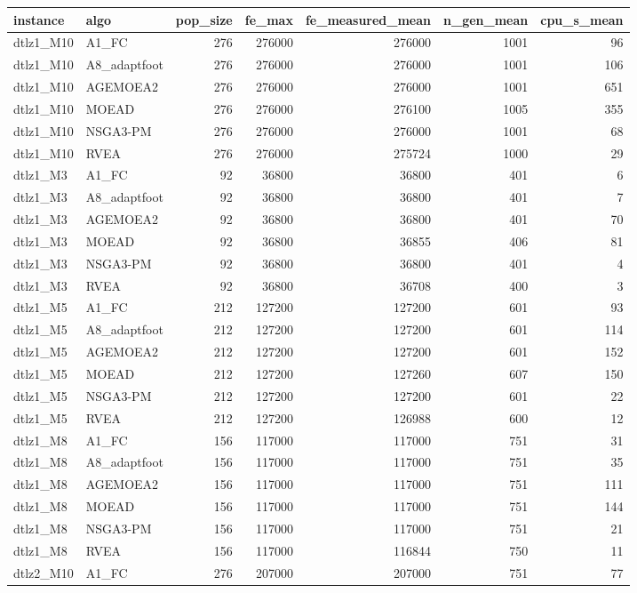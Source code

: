 \begin{tabular}{llrrrrr}
\toprule
instance & algo & pop_size & fe_max & fe_measured_mean & n_gen_mean & cpu_s_mean \\
\midrule
dtlz1_M10 & A1_FC & 276 & 276000 & 276000 & 1001 & 96 \\
dtlz1_M10 & A8_adaptfoot & 276 & 276000 & 276000 & 1001 & 106 \\
dtlz1_M10 & AGEMOEA2 & 276 & 276000 & 276000 & 1001 & 651 \\
dtlz1_M10 & MOEAD & 276 & 276000 & 276100 & 1005 & 355 \\
dtlz1_M10 & NSGA3-PM & 276 & 276000 & 276000 & 1001 & 68 \\
dtlz1_M10 & RVEA & 276 & 276000 & 275724 & 1000 & 29 \\
dtlz1_M3 & A1_FC & 92 & 36800 & 36800 & 401 & 6 \\
dtlz1_M3 & A8_adaptfoot & 92 & 36800 & 36800 & 401 & 7 \\
dtlz1_M3 & AGEMOEA2 & 92 & 36800 & 36800 & 401 & 70 \\
dtlz1_M3 & MOEAD & 92 & 36800 & 36855 & 406 & 81 \\
dtlz1_M3 & NSGA3-PM & 92 & 36800 & 36800 & 401 & 4 \\
dtlz1_M3 & RVEA & 92 & 36800 & 36708 & 400 & 3 \\
dtlz1_M5 & A1_FC & 212 & 127200 & 127200 & 601 & 93 \\
dtlz1_M5 & A8_adaptfoot & 212 & 127200 & 127200 & 601 & 114 \\
dtlz1_M5 & AGEMOEA2 & 212 & 127200 & 127200 & 601 & 152 \\
dtlz1_M5 & MOEAD & 212 & 127200 & 127260 & 607 & 150 \\
dtlz1_M5 & NSGA3-PM & 212 & 127200 & 127200 & 601 & 22 \\
dtlz1_M5 & RVEA & 212 & 127200 & 126988 & 600 & 12 \\
dtlz1_M8 & A1_FC & 156 & 117000 & 117000 & 751 & 31 \\
dtlz1_M8 & A8_adaptfoot & 156 & 117000 & 117000 & 751 & 35 \\
dtlz1_M8 & AGEMOEA2 & 156 & 117000 & 117000 & 751 & 111 \\
dtlz1_M8 & MOEAD & 156 & 117000 & 117000 & 751 & 144 \\
dtlz1_M8 & NSGA3-PM & 156 & 117000 & 117000 & 751 & 21 \\
dtlz1_M8 & RVEA & 156 & 117000 & 116844 & 750 & 11 \\
dtlz2_M10 & A1_FC & 276 & 207000 & 207000 & 751 & 77 \\

\end{tabular}
